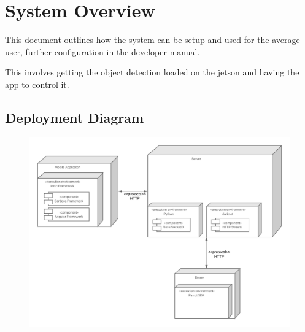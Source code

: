 \chapter{System Overview}

This document outlines how the system can be setup and used for the average user, further configuration in the developer manual.

This involves getting the object detection loaded on the jetson and having the app to control it.

\section{Deployment Diagram}

\begin{figure}[!h]
    \centering
	\includegraphics[scale=0.7]{./assets/images/deployment-diagram.png}
	\label{fig: deploymentDiagram}
\end{figure}